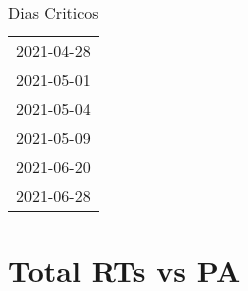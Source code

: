\documentclass[
]{article}
\author{}
\date{\vspace{-2.5em}}
\begin{document}
\begin{table}[H]
    \centering
    \caption{Dias Criticos}
    \label{tab:dias_criticos}
    \begin{tabular}{c}
        \toprule
          2021-04-28 \\
          2021-05-01 \\
          2021-05-04 \\ 
          2021-05-09 \\
          2021-06-20 \\
          2021-06-28 \\
        \bottomrule
    \end{tabular}
\end{table}

\tableofcontents
\newpage
\section{Total RTs vs PA}
\end{document}
